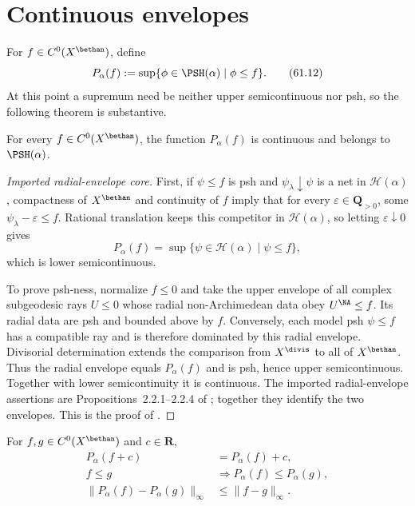\section{Continuous envelopes}
\label{sec:mpwn-envelopes}

For $f\in C^0(X^{\bethan})$, define
\[
 P_\alpha(f)
 :=\sup\{\phi\in\PSH(\alpha)\mid\phi\leq f\}.
\tag{61.12}\label{eq:mpwn-envelope}
\]
At this point a supremum need be neither upper semicontinuous nor psh, so
the following theorem is substantive.

\begin{theorem}\label{thm:mpwn-envelope-continuity}
For every $f\in C^0(X^{\bethan})$, the function $P_\alpha(f)$ is
continuous and belongs to $\PSH(\alpha)$.
\end{theorem}

\begin{proof}[Imported radial-envelope core]
First, if $\psi\leq f$ is psh and
$\psi_\lambda\downarrow\psi$ is a net in $\mathcal H(\alpha)$,
compactness of $X^{\bethan}$ and continuity of $f$ imply that for every
$\varepsilon\in\mathbf Q_{>0}$, some
$\psi_\lambda-\varepsilon\leq f$. Rational translation keeps this
competitor in $\mathcal H(\alpha)$, so letting $\varepsilon\downarrow0$
gives
\[
 P_\alpha(f)
 =\sup\{\psi\in\mathcal H(\alpha)\mid\psi\leq f\},
\tag{61.13}\label{eq:mpwn-envelope-model-sup}
\]
which is lower semicontinuous.

To prove psh-ness, normalize $f\leq0$ and take the upper envelope of all
complex subgeodesic rays $U\leq0$ whose radial non-Archimedean data obey
$U^{\NA}\leq f$.  Its radial data are psh and bounded above by $f$.
Conversely, each model psh $\psi\leq f$ has a compatible ray and is
therefore dominated by this radial envelope.  Divisorial determination
extends the comparison from $X^{\divis}$ to all of $X^{\bethan}$.
Thus the radial envelope equals $P_\alpha(f)$ and is psh, hence upper
semicontinuous.  Together with lower semicontinuity it is continuous.
The imported radial-envelope assertions are Propositions~2.2.1--2.2.4 of
\cite{MPWN25}; together they identify the two envelopes.  This is the proof
of \cite[Theorem~1.4.1]{MPWN25}.
\end{proof}

\begin{proposition}\label{prop:mpwn-envelope-calculus}
For $f,g\in C^0(X^{\bethan})$ and $c\in\mathbf R$,
\[
 \begin{split}
 P_\alpha(f+c)&=P_\alpha(f)+c,\\
 f\leq g&\Longrightarrow P_\alpha(f)\leq P_\alpha(g),\\
 \|P_\alpha(f)-P_\alpha(g)\|_\infty
       &\leq\|f-g\|_\infty.
 \end{split}
\tag{61.14}\label{eq:mpwn-envelope-calculus}
\]
\end{proposition}

